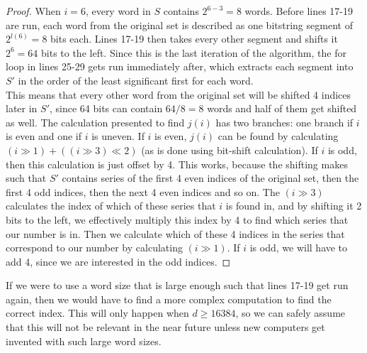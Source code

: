 \begin{proof}
When $i=6$, every word in $S$ contains $2^{6-3}=8$ words. Before lines 17-19 are run, each word from the original set is described as one bitstring segment of $2^{l(6)}=8$ bits each.
Lines 17-19 then takes every other segment and shifts it $2^6=64$ bits to the left. Since this is the last iteration of the algorithm, the for loop in lines 25-29 gets run immediately after, which extracts each segment into $S'$ in the order of the least significant first for each word.\\
This means that every other word from the original set will be shifted 4 indices later in $S'$, since 64 bits can contain $64/8=8$ words and half of them get shifted as well. 
The calculation presented to find $j(i)$ has two branches: one branch if $i$ is even and one if $i$ is uneven. If $i$ is even, $j(i)$ can be found by calculating $(i \gg 1) + ((i\gg 3) \ll 2)$ (as is done using bit-shift calculation). If $i$ is odd, then this calculation is just offset by 4.
This works, because the shifting makes such that $S'$ contains series of the first 4 even indices of the original set, then the first 4 odd indices, then the next 4 even indices and so on. The $(i \gg 3)$ calculates the index of which of these series that $i$ is found in, and by shifting it 2 bits to the left, we effectively multiply this index by 4 to find which series that our number is in. Then we calculate which of these 4 indices in the series that correspond to our number by calculating $(i \gg 1)$. If $i$ is odd, we will have to add 4, since we are interested in the odd indices.
\end{proof}
If we were to use a word size that is large enough such that lines 17-19 get run again, then we would have to find a more complex computation to find the correct index. This will only happen when $d\geq16384$, so we can safely assume that this will not be relevant in the near future unless new computers get invented with such large word sizes.
